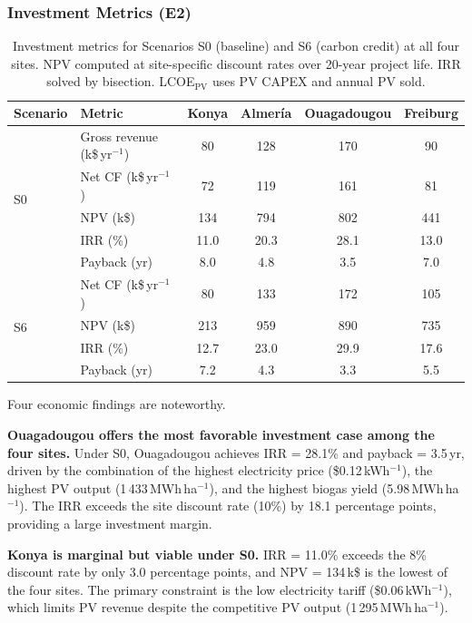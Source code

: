 \subsubsection{Investment Metrics (E2)}

\begin{table}[H]
	\caption{Investment metrics for Scenarios S0 (baseline) and S6
		(carbon credit) at all four sites. NPV computed at site-specific
		discount rates over 20-year project life. IRR solved by bisection.
		LCOE$_{\text{PV}}$ uses PV CAPEX and annual PV sold.}
	\label{tab:economics}
	\centering
	\begin{tabular}{llcccc}
		\toprule
		\textbf{Scenario} & \textbf{Metric} & \textbf{Konya}
		& \textbf{Almer\'{i}a} & \textbf{Ouagadougou} & \textbf{Freiburg} \\
		\midrule
		\multirow{5}{*}{S0}
		& Gross revenue (k\$\,yr$^{-1}$) & 80  & 128 & 170 & 90  \\
		& Net CF (k\$\,yr$^{-1}$)        & 72  & 119 & 161 & 81  \\
		& NPV (k\$)                       & 134 & 794 & 802 & 441 \\
		& IRR (\%)                        & 11.0 & 20.3 & 28.1 & 13.0 \\
		& Payback (yr)                    & 8.0  & 4.8  & 3.5  & 7.0  \\
		\midrule
		\multirow{4}{*}{S6}
		& Net CF (k\$\,yr$^{-1}$)        & 80  & 133 & 172 & 105 \\
		& NPV (k\$)                       & 213 & 959 & 890 & 735 \\
		& IRR (\%)                        & 12.7 & 23.0 & 29.9 & 17.6 \\
		& Payback (yr)                    & 7.2  & 4.3  & 3.3  & 5.5  \\
		\bottomrule
	\end{tabular}
\end{table}

Four economic findings are noteworthy.

\textbf{Ouagadougou offers the most favorable investment case among the four sites.}
Under S0, Ouagadougou achieves IRR = 28.1\% and payback = 3.5\,yr,
driven by the combination of the highest electricity price
(\$0.12\,kWh$^{-1}$), the highest PV output (1\,433\,MWh\,ha$^{-1}$),
and the highest biogas yield (5.98\,MWh\,ha$^{-1}$). The IRR exceeds
the site discount rate (10\%) by 18.1 percentage points, providing
a large investment margin.

\textbf{Konya is marginal but viable under S0.}
IRR = 11.0\% exceeds the 8\% discount rate by only 3.0 percentage
points, and NPV = 134\,k\$ is the lowest of the four sites. The
primary constraint is the low electricity tariff
(\$0.06\,kWh$^{-1}$), which limits PV revenue despite the
competitive PV output (1\,295\,MWh\,ha$^{-1}$).

